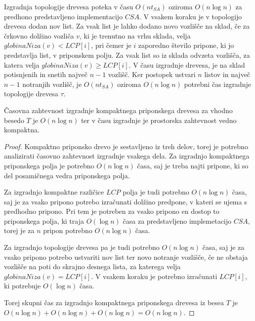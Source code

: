 Izgradnja topologije drevesa poteka v času $O(nt_{SA})$ oziroma $O(n\log{n})$ za predhono predstavljeno implementacijo $CSA$. V vsakem koraku je v topologijo drevesa dodan nov list. Za vsak list je lahko dodano novo vozlišče na sklad, če za črkovno dolžino vozliča $v$, ki je trenutno na vrhu sklada, velja $globinaNiza(v)<LCP[i]$, pri čemer je  $i$ zaporedno število pripone, ki jo predstavlja list, v priponskem polju. Za vsak list so iz sklada odvzeta vozlišča, za katera velja $globinaNiza(v)\ge LCP[i]$. V času izgradnje drevesa, je na sklad potisnjenih in snetih največ $n-1$ vozlišč. Ker postopek ustvari $n$ listov in največ $n-1$ notranjih vozlišč, je $O(nt_{SA})$ oziroma $O(n\log{n})$ potrebni čas izgradnje topologije drevesa $\tau$.

\begin{izr} \label{izr:izgradnjaCST}
    Časovna zahtevnost izgradnje kompaktnega priponskega drevesa za vhodno besedo $T$ je $O(n\log{n})$ ter v času izgradnje je prostorska zahtevnost vedno kompaktna.
\end{izr}

\begin{proof}
    Kompaktno priponsko drevo je sestavljeno iz treh delov, torej je potrebno analizirati časovno zahtevnost izgradnje vsakega dela. Za izgradnjo kompaktnega priponskega polja je potrebno $O(n\log{n})$ časa, saj je treba najti pripone, ki so del posamičnega vedra priponskega polja.
    
    Za izgradnjo kompaktne različice $LCP$ polja je tudi potrebno $O(n\log{n})$ časa, saj je za vsako pripono potrebo izračunati dolžino predpone, v kateri se ujema s predhodno pripono. Pri tem je potreben za vsako pripono en dostop to priponskega polja, ki traja $O(\log{n})$ časa za predstavljeno implemetacijo $CSA$, torej je za $n$ pripon potrebno $O(n\log{n})$ časa.

    Za izgradnjo topologije drevesa pa je tudi potrebno $O(n\log{n})$ časa, saj je za vsako pripono potrebo ustvariti nov list ter novo notranje vozlišče, če ne obstaja vozlišče na poti do skrajno desnega lista, za katerega velja $globinaNiza(v)=LCP[i]$. V vsakem koraku je potrebno izračunati $LCP[i]$, ki potrebuje $O(\log{n})$ časa.

    Torej skupni čas za izgradnjo kompaktnega priponskega drevesa iz besea $T$ je $O(n\log{n})+O(n\log{n})+O(n\log{n})=O(n\log{n})$.
\end{proof}

